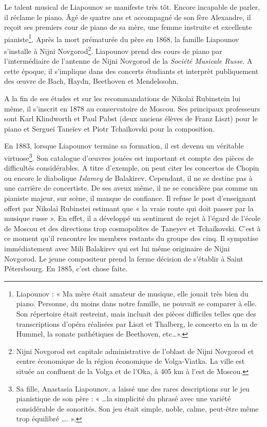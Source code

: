 Le talent musical de Liapounov se manifeste très tôt. Encore incapable de parler, il réclame le piano. Âgé de quatre ans et accompagné de son fère Alexandre, il reçoit ses premiers cour de piano de sa mère, une femme instruite et excellente pianiste\footnote{Liapounov : « Ma mère était amateur de musique, elle jouait très bien du piano. Personne, du moins dans notre famille, ne pouvait se comparer à elle. Son répertoire était restreint, mais incluait des pièces difficiles telles que des transcriptions d'opéra réalisées par Liszt et Thalberg, le concerto en la m de Hummel, la sonate pathétiques de Beethoven, etc\dots ».}. Après la mort prématurée du père en 1868, la famille Liapounov s'installe à Nijni Novgorod\footnote{Nijni Novgorod est capitale administrative de l'oblast de Nijni Novgorod et centre économique de la région économique de Volga-Viatka. La ville est située au confluent de la Volga et de l'Oka, à 405 km à l'est de Moscou.}. Liapounov prend des cours de piano par l'intermédiaire de l'antenne de Nijni Novgorod de la \emph{Société Musicale Russe}. A cette époque, il s'implique dans des concerts étudiants et interprèt publiquement des œuvre de Bach, Haydn, Beethoven et Mendelssohn.

A la fin de ses études et sur les recommandations de Nikolaï Rubinstein lui même, il s'inscrit en 1878 au conservatoire de Moscou. Ses principaux professeurs sont Karl Klindworth et Paul Pabst (deux anciens élèves de Franz Liszt) pour le piano et Sergueï Taneïev et Piotr Tchaïkovski pour la composition.

En 1883, lorsque Liapounov termine sa formation, il est devenu un véritable virtuose\footnote{Sa fille, Anastasia Liapounov, a laissé une des rares descriptions sur le jeu pianistique de son père : « \ldots la simplicité du phrasé avec une variété considérable de sonorités. Son jeu était simple, noble, calme, peut-être même trop équilibré \ldots. ».}. Son catalogue d'œuvres jouées est important et compte des pièces de difficultés considérables. A titre d'exemple, on peut citer les concertos de Chopin ou encore le diabolique \emph{Islamey} de Balakirev. Cependant, il ne se destine pas à une carrière de concertiste. De ses aveux même, il ne se concidère pas comme un pianiste majeur, sur scène, il manque de confiance. Il refuse le post d'enseignant offert par Nikolaï Rubinstei estimant que « la vraie route qui doit passer par la musique russe ». En effet, il a développé un sentiment de rejet à l'égard de l'école de Moscou et des directions trop cosmopolites de Taneyev et Tchaïkovski. C'est à ce moment qu'il rencontre les membres restants du groupe des cinq. Il sympatise immédiatement avec Mili Balakirev qui est lui même originaire de Nijni Novgorod. Le jeune compositeur prend la ferme décision de s'établir à Saint Pétersbourg. En 1885, c'est chose faite.

